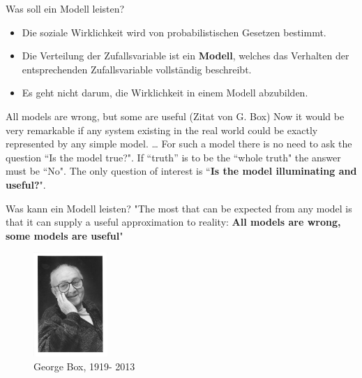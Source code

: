 \documentclass[usenames,dvipsnames,handout]{beamer}
\newcommand{\oldtextdied}{{\fontfamily{cmr}\selectfont\textdied}}
\newcommand{\oldtextborn}{{\fontfamily{cmr}\selectfont\textborn}}
\begin{document}
\begin{frame}{Was soll ein  Modell leisten?}
\begin{itemize}
\item{Die soziale Wirklichkeit wird von probabilistischen Gesetzen bestimmt.}\pause
\item{Die Verteilung der Zufallsvariable ist ein \textbf{ Modell}, welches das Verhalten der entsprechenden Zufallsvariable vollständig beschreibt.}\pause
\item{Es geht nicht darum, die Wirklichkeit in einem Modell abzubilden. }\pause
\end{itemize}
\begin{block}{All models are wrong, but some are useful (Zitat von G. Box)}
Now it would be very remarkable if any system existing in the real world could be exactly represented by any simple model.  \dots
For such a model there is no need to ask the question ``Is the model true?". If ``truth'' is to be the ``whole truth" the answer must be ``No". The only question of interest is ``\textbf{Is the model illuminating and useful?}".
\end{block}
\end{frame}
\begin{frame}{Was kann ein Modell leisten?}
"The most that can be expected from any model is that it can supply a useful approximation to reality: \textbf{All models are wrong, some models are useful}"
  \begin{figure}[ht]
 	\centering
 	      \includegraphics[width=0.25\textwidth]{GeorgeEPBox.jpg}
 	      \caption{George  Box, \oldtextborn 1919- \oldtextdied 2013}
 	\end{figure}
\end{frame}

\end{document}
